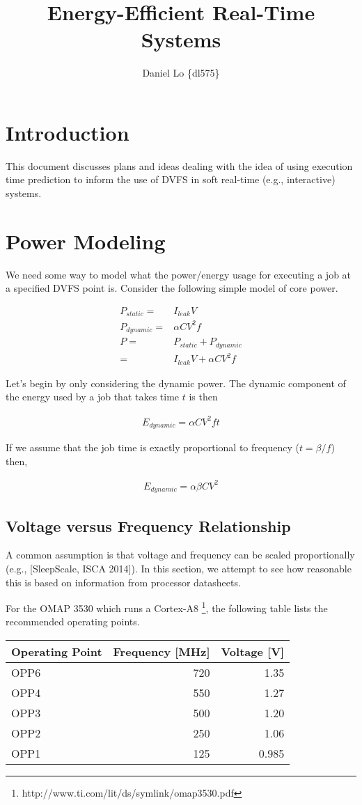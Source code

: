 \documentclass[11pt, letterpaper]{article}
\title{Energy-Efficient Real-Time Systems}
\author{Daniel Lo \{dl575\}}
\providecommand{\eq}[1]{
		\begin{align*}
		#1
		\end{align*}
	}
\begin{document}

\section{Introduction}

This document discusses plans and ideas dealing with the idea of using
execution time prediction to inform the use of DVFS in soft real-time (e.g.,
interactive) systems.

\section{Power Modeling}

We need some way to model what the power/energy usage for executing a job at a
specified DVFS point is. Consider the following simple model of core power.

\eq{
  P_{static} =& I_{leak}V \\
  P_{dynamic} =& \alpha C V^2 f \\
  P =& P_{static} + P_{dynamic} \\
  =& I_{leak}V + \alpha C V^2 f 
}

Let's begin by only considering the dynamic power. The dynamic component of the energy used by a job that takes time $t$ is then
\eq{
  E_{dynamic} = \alpha C V^2 f t
}
If we assume that the job time is exactly proportional to frequency ($t = \beta/f$) then,
\eq{
  E_{dynamic} = \alpha \beta C V^2
}

\subsection{Voltage versus Frequency Relationship}
\label{sec:voltage_vs_frequency}

A common assumption is that voltage and frequency can be scaled proportionally
(e.g., [SleepScale, ISCA 2014]). In this section, we attempt to see how
reasonable this is based on information from processor datasheets.

For the OMAP 3530 which runs a Cortex-A8
\footnote{http://www.ti.com/lit/ds/symlink/omap3530.pdf}, the following table
lists the recommended operating points.

\begin{tabular}{|l|r|r|}
\hline
Operating Point & Frequency [MHz] & Voltage [V] \\ \hline\hline
OPP6 & 720 & 1.35  \\ \hline   
OPP4 & 550 & 1.27  \\ \hline   
OPP3 & 500 & 1.20  \\ \hline   
OPP2 & 250 & 1.06  \\ \hline   
OPP1 & 125 & 0.985 \\ \hline   
\end{tabular}
\end{document}
